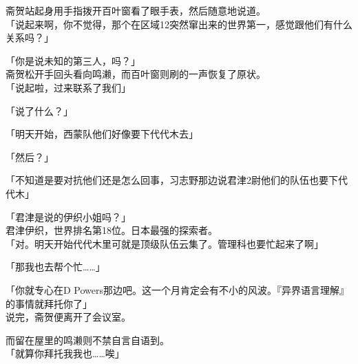 斋贺站起身用手指拨开百叶窗看了眼手表，然后随意地说道。\\

「说起来啊，你不觉得，那个在区域12突然窜出来的世界第一，感觉跟他们有什么关系吗？」

「你是说未知的第三人，吗？」\\

斋贺松开手回头看向鸣濑，而百叶窗则刷的一声恢复了原状。\\

「说起啦，过来联系了我们」

「说了什么？」

「明天开始，西蒙队他们好像要下代代木去」

「然后？」

「不知道是要对抗他们还是怎么回事，习志野那边说君津2尉他们的队伍也要下代代木」

「君津是说的伊织小姐吗？」\\

君津伊织，世界排名第18位。日本最强的探索者。\\

「对。明天开始代代木里可就是顶级队伍云集了。管理科也要忙起来了啊」

「那我也去帮个忙……」

「你就专心在D Powers那边吧。这一个月肯定会有不小的风波。『异界语言理解』的事情就拜托你了」\\

说完，斋贺便离开了会议室。

而留在屋里的鸣濑则不禁自言自语到。\\

「就算你拜托我我也……唉」\\
